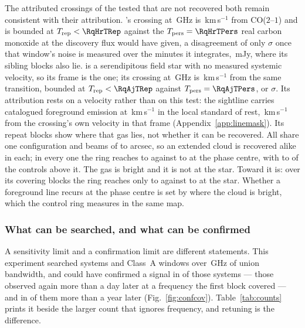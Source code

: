 The \MkAttrExcl{} attributed crossings of the \MkAttrTested{} tested that are
not recovered both remain consistent with their attribution. \RqHrStar's
crossing at \RqHrFreq\,GHz is \RqHrDv\,km\,s$^{-1}$ from CO($2$--$1$) and is
bounded at $T_{\rm rep}<\RqHrTRep$ against the $T_{\rm pers}=\RqHrTPers$ real
carbon monoxide at the discovery flux would have given, a disagreement of only
\RqHrExcl$\sigma$ once that window's noise is measured over the
\RqHrOnsMin{} minutes it integrates, \RqHrRms\,mJy, where its sibling blocks
also lie. \RqAjStar{} is a
serendipitous field star with no measured systemic velocity, so its frame is
the \RqAjFrame{} one; its crossing at \RqAjFreq\,GHz is \RqAjDv\,km\,s$^{-1}$
from the same transition, bounded at $T_{\rm rep}<\RqAjTRep$
against $T_{\rm pers}=\RqAjTPers$, or \RqAjExcl$\sigma$. Its attribution rests
on a velocity rather than on this test: the sightline carries catalogued
foreground emission at \LsLupVco\,km\,s$^{-1}$ in the local standard of rest,
\LsLupDv\,km\,s$^{-1}$ from the crossing's own velocity in that frame
(Appendix~\ref{app:linemask}). Its repeat blocks show where that gas lies, not
whether it can be recovered. All \RqAjNRep{} share one \RqAjArray{}
configuration and beams of \RqAjBeamLo{} to \RqAjBeamHi{} arcsec, so an
extended cloud is recovered alike in each; in every one the ring reaches
\RqAjCtrlLo{} to \RqAjCtrlHi{} against \RqAjStarLo{} to \RqAjStarHi{} at the
phase centre, with \RqAjNgeLo{} to \RqAjNgeHi{} of the \NCtrl{} controls above
it. The gas is bright and it is not at the star. Toward
\RqRecurCloudStars{} it is: over its \RqCtlNBlock{} covering blocks the ring
reaches only \RqCtlRingLo{} to
\RqCtlRingHi{} against \RqCtlStarLo{} to \RqCtlStarHi{} at the star.
Whether a foreground line recurs at the phase centre is set by where the cloud
is bright, which the control ring measures in the same map.

\subsubsection{What can be searched, and what can be confirmed}
\label{sec:confirmability}

A sensitivity limit and a confirmation limit are different statements. This
experiment searched \RcSearchSys{} systems and \RcSearchWin{} Class~A windows
over \CvUnionA\,GHz of union bandwidth, and could have confirmed a signal in
\RcConfSysDay{} of those systems --- those observed again more than a day
later at a frequency the first block covered --- and in \RcConfSysYr{} of
them more than a year later (Fig.~\ref{fig:confcov}).
Table~\ref{tab:counts} prints it beside the larger count that ignores
frequency, and retuning is the difference.

